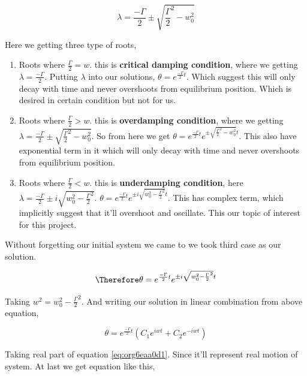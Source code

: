 \documentclass[11pt,a4paper]{article}
\begin{document}
\begin{equation}
\label{eq:org3b06c6c}
\lambda = \frac{-\Gamma}{2} \pm \sqrt{\frac{\Gamma}{2}^{2}-w_{0}^{2}}
\end{equation}

Here we getting three type of roots,

\begin{enumerate}
\item Roots where \(\frac{\Gamma}{2}=w\). this is \textbf{critical damping condition}, where we getting \(\lambda=\frac{-\Gamma}{2}\). Putting \(\lambda\) into our solutions, \(\theta = e^{\frac{-\Gamma}{2}t}\). Which suggest this will only decay with time and never overshoots from equilibrium position. Which is desired in certain condition but not for us.

\item Roots where \(\frac{\Gamma}{2}>w\). this is \textbf{overdamping condition}, where we getting \(\lambda=\frac{-\Gamma}{2}\pm\sqrt{\frac{\Gamma}{2}^{2}-w_{0}^{2}}\). So from here we get \(\theta = e^{\frac{-\Gamma}{2}t}e^{\pm\sqrt{\frac{\Gamma}{2}^{2}-w_{0}^{2}}t}\). This also have exponential term in it which will only decay with time and never overshoots from equilibrium position.

\item Roots where \(\frac{\Gamma}{2}<w\). this is \textbf{underdamping condition}, here  \(\lambda=\frac{-\Gamma}{2}\pm i\sqrt{w_{0}^{2}-\frac{\Gamma}{2}^{2}}\). \(\theta = e^{\frac{-\Gamma}{2}t}e^{\pm i \sqrt{w_{0}^{2}-\frac{\Gamma}{2}^{2}}t}\). This has complex term, which implicitly suggest that it'll overshoot and oscillate. This our topic of interest for this project.
\end{enumerate}


Without forgetting our initial system we came to we took third case as our solution.

\begin{equation*}
\label{eq:org567bd94}
\Therefore \theta = e^{\frac{-\Gamma}{2}t}e^{\pm i \sqrt{w_{0}^{2}-\frac{\Gamma}{2}^{2}}t}
\end{equation*}

Taking \(w^{2} = w_{0}^{2}-\frac{\Gamma}{2}^{2}\). And writing our solution in linear combination from above equation,

\begin{equation}
\label{eq:org6eaa0d1}
\theta = e^{\frac{-\Gamma}{2}t}(C_{1}e^{iwt}+C_{2}e^{-iwt})
\end{equation}

Taking real part of equation \ref{eq:org6eaa0d1}. Since it'll represent real motion of system. At last we get equation like this,
\end{document}
